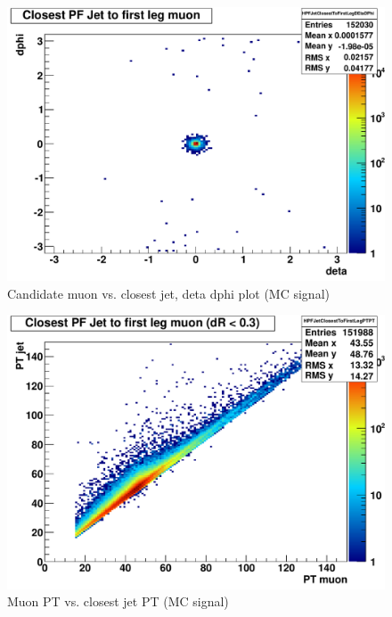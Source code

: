 \documentclass{cmspaper2}
\begin{document}
\begin{figure}[hbtp]
\begin{center}
\includegraphics[width=150mm]{HPFJetClosestToFirstLegDEtaDPhi}
\caption{Candidate muon vs. closest jet, deta dphi plot (MC signal)}
\label{Figure_CandidateMuonVsClosestJetEtaPhi}
\end{center}
\end{figure}

\begin{figure}[hbtp]
\begin{center}
\includegraphics[width=150mm]{HPFJetClosestToFirstLegPTPT}
\caption{Muon PT vs. closest jet PT (MC signal)}
\label{Figure_CandidateMuonVsClosestJetPT}
\end{center}
\end{figure}
\end{document}

